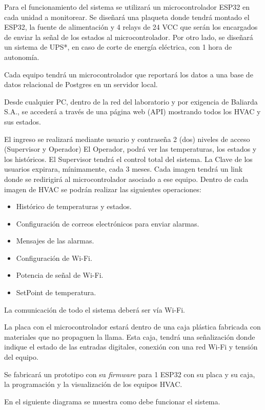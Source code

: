 \documentclass[
11pt, %
codirector, %
]{charter}
\begin{document}
Para el funcionamiento del sistema se utilizará un microcontrolador ESP32 en cada unidad a monitorear. Se diseñará una plaqueta donde tendrá montado el ESP32, la fuente de alimentación y 4 relays de 24 VCC que serán los encargados de enviar la señal de los estados al microcontrolador. Por otro lado, se diseñará un sistema de UPS*, en caso de corte de energía eléctrica, con 1 hora de autonomía.\par 
Cada equipo tendrá un microcontrolador que reportará los datos a una base de datos relacional de Postgres en un servidor local.\par 
Desde cualquier PC, dentro de la red del laboratorio y por exigencia de Baliarda S.A., se accederá a través de una página web (API) mostrando todos los HVAC y sus estados.\par 
El ingreso se realizará mediante usuario y contraseña 2 (dos) niveles de acceso (Supervisor y Operador)
El Operador, podrá ver las temperaturas, los estados y los históricos.
El Supervisor tendrá el control total del sistema.
La Clave de los usuarios expirara, mínimamente, cada 3 meses.
Cada imagen tendrá un link donde se redirigirá al microcontrolador asociado a ese equipo.
Dentro de cada imagen de HVAC se podrán realizar las siguientes operaciones:
\begin{itemize}
\item Histórico de temperaturas y estados.
\item Configuración de correos electrónicos para enviar alarmas.
\item Mensajes de las alarmas.
\item Configuración de Wi-Fi.
\item Potencia de señal de Wi-Fi.
\item SetPoint de temperatura.
\end{itemize}
La comunicación de todo el sistema deberá ser vía Wi-Fi. \par 
La placa con el microcontrolador estará dentro de una caja plástica fabricada con materiales que no propaguen la llama. Esta caja, tendrá una señalización donde indique el estado de las entradas digitales, conexión con una red Wi-Fi y tensión del equipo. \par 
Se fabricará un prototipo con su \textit{firmware} para 1 ESP32 con su placa y su caja, la programación y la visualización de los equipos HVAC.\par 
En el siguiente diagrama se muestra como debe funcionar el sistema.\par
\end{document}
